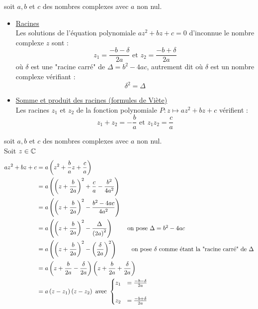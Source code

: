 \begin{defprop}
    soit \(a,b\) et \(c\) des nombres complexes avec \(a\) non nul. \\
    \begin{itemize}
        \item \underline{Racines} \\Les solutions de l'équation polynomiale \(az^2+bz+c=0\) d'inconnue le nombre complexe \(z\) sont : 
        \[z_1 = \frac{-b-\delta}{2a} \text{ et } z_2 = \frac{-b+\delta}{2a}\]
        où \(\delta\) est une "racine carré" de \(\Delta = b^2 -4ac\), autrement dit où \(\delta\) est un nombre complexe vérifiant : 
        \[\delta^2 = \Delta\]
        \item \underline{Somme et produit des racines (formules de Viète)} \\
        Les racines \(z_1\) et \(z_2\) de la fonction polynomiale \(P:z\mapsto az^2 + bz +c \) vérifient :
        \[z_1+z_2 = -\frac{b}{a} \text{ et } z_1z_2 = \frac{c}{a}\]

    \end{itemize}
\end{defprop}

\begin{dem}
    soit \(a,b\) et \(c\) des nombres complexes avec \(a\) non nul. \\
    Soit \(z \in \mathbb{C}\)
    \begin{align*}
        az^2+bz+c &= a\left(z^2+\frac{b}{a}z+\frac{c}{a}\right) \\
        &=a\left(\left(z+\frac{b}{2a}\right)^2+\frac{c}{a} - \frac{b^2}{4a^2}\right) \\
        &=a\left(\left(z+\frac{b}{2a}\right)^2 - \frac{b^2-4ac}{4a^2}\right) \\
        &=a\left(\left(z+\frac{b}{2a}\right)^2 - \frac{\Delta}{\left(2a\right)^2}\right)  \tag*{ on pose \(\Delta = b^2-4ac\)}\\
        &=a\left(\left(z+\frac{b}{2a}\right)^2 - \left(\frac{\delta}{2a}\right)^2\right) \tag*{ on pose \(\delta\)  comme étant la "racine carré" de \(\Delta\)}\\
        &=a\left(z+\frac{b}{2a}-\frac{\delta}{2a}\right)\left(z+\frac{b}{2a}+\frac{\delta}{2a}\right) \\
        &=a\left(z-z_1\right)\left(z-z_2\right) \text{ avec } 
        \begin{cases}
            z_1 &= \frac{-b-\delta}{2a} \\\\
            z_2 &= \frac{-b+\delta}{2a}
        \end{cases}
    \end{align*}
\end{dem}

